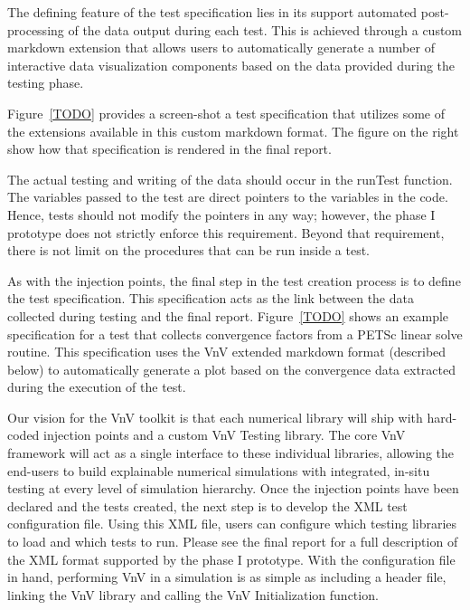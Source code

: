 The defining feature of the test specification lies in its support automated post-processing of the data output during each test. This is achieved 
through a custom markdown extension that allows users to automatically generate a number of interactive data visualization components based on the 
data provided during the testing phase. 

Figure~\ref{TODO} provides a screen-shot a test specification that utilizes some of the extensions available in this custom markdown format. The figure on 
the right show how that specification is rendered in the final report. 





The actual testing and writing of the data should occur in the runTest function. The variables passed to the test are direct pointers to the variables in the code. Hence, tests should not modify the pointers in any way; however, the phase I prototype does not strictly enforce this requirement. Beyond that requirement, there is not limit on the procedures that can be run inside a test. 

As with the injection points, the final step in the test creation process is to define the test specification. This specification acts as the link between the data collected during testing and the final report. Figure~\ref{TODO} shows an example specification 
for a test that collects convergence factors from a PETSc linear solve routine. This specification uses the VnV extended markdown format (described below) to automatically generate a plot based on the convergence data extracted during the execution of the test.

Our vision for the VnV toolkit is that each numerical library will ship with hard-coded injection points and a custom VnV Testing library. The core VnV framework will act as a single interface to these individual libraries, allowing the end-users to build explainable numerical simulations with integrated, in-situ testing at every level of simulation hierarchy. Once the injection points have been declared and the tests created, the next step is to develop the XML test configuration file. Using this XML file, users can configure which testing libraries to load and which tests to run. Please see the final report for a full description of the XML format supported by the phase I prototype. With the configuration file in hand, performing VnV in a simulation is as simple as including a header file, linking the VnV library and calling the VnV Initialization function. 

